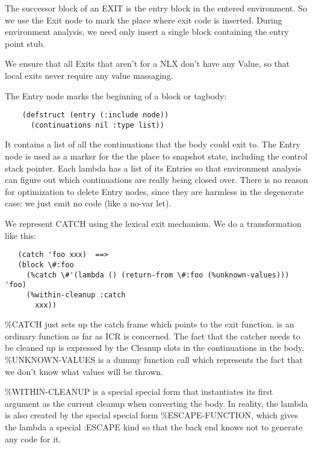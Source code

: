 The successor block of an EXIT is the entry block in the entered environment.
So we use the Exit node to mark the place where exit code is inserted.  During
environment analysis, we need only insert a single block containing the entry
point stub.

We ensure that all Exits that aren't for a NLX don't have any Value, so that
local exits never require any value massaging.

The Entry node marks the beginning of a block or tagbody:
\begin{verbatim} 
    (defstruct (entry (:include node))
      (continuations nil :type list)) 
\end{verbatim}
It contains a list of all the continuations that the body could exit to.  The
Entry node is used as a marker for the the place to snapshot state, including
the control stack pointer.  Each lambda has a list of its Entries so
that environment analysis can figure out which continuations are really being
closed over.  There is no reason for optimization to delete Entry nodes,
since they are harmless in the degenerate case: we just emit no code (like a
no-var let).


We represent CATCH using the lexical exit mechanism.  We do a transformation
like this:
\begin{verbatim}
   (catch 'foo xxx)  ==>
   (block \#:foo
     (%catch \#'(lambda () (return-from \#:foo (%unknown-values))) 'foo)
     (%within-cleanup :catch
       xxx))
\end{verbatim}

\%CATCH just sets up the catch frame which points to the exit function.  %
is an ordinary function as far as ICR is concerned.  The fact that the catcher
needs to be cleaned up is expressed by the Cleanup slots in the continuations
in the body.  \%UNKNOWN-VALUES is a dummy function call which represents the
fact that we don't know what values will be thrown.  

\%WITHIN-CLEANUP is a special special form that instantiates its first argument
as the current cleanup when converting the body.  In reality, the lambda is
also created by the special special form \%ESCAPE-FUNCTION, which gives the
lambda a special :ESCAPE kind so that the back end knows not to generate any
code for it.


